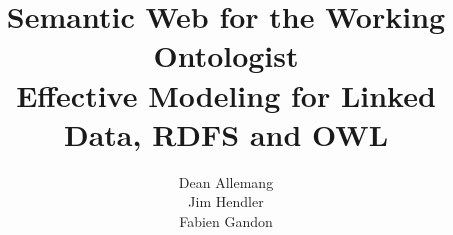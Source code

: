 
\title{Semantic Web for the Working Ontologist\\
\Large Effective Modeling for Linked Data, RDFS and OWL}
\author{Dean Allemang\\
Jim Hendler\\
Fabien Gandon}

\maketitle


\tableofcontents


